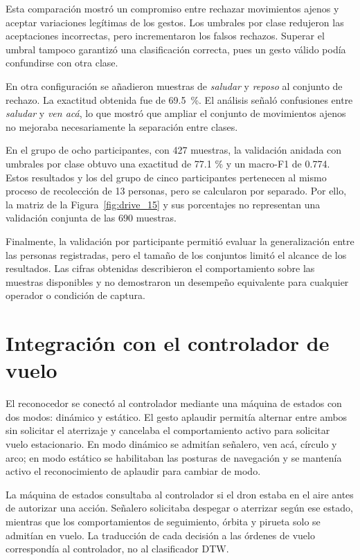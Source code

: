 Esta comparación mostró un compromiso entre rechazar movimientos ajenos y aceptar variaciones legítimas de los gestos. Los umbrales por clase redujeron las aceptaciones incorrectas, pero incrementaron los falsos rechazos. Superar el umbral tampoco garantizó una clasificación correcta, pues un gesto válido podía confundirse con otra clase.

En otra configuración se añadieron muestras de \textit{saludar} y \textit{reposo} al conjunto de rechazo. La exactitud obtenida fue de 69.5 \%. El análisis señaló confusiones entre \textit{saludar} y \textit{ven acá}, lo que mostró que ampliar el conjunto de movimientos ajenos no mejoraba necesariamente la separación entre clases.

En el grupo de ocho participantes, con 427 muestras, la validación anidada con umbrales por clase obtuvo una exactitud de 77.1 \% y un macro-F1 de 0.774. Estos resultados y los del grupo de cinco participantes pertenecen al mismo proceso de recolección de 13 personas, pero se calcularon por separado. Por ello, la matriz de la Figura~\ref{fig:drive_15} y sus porcentajes no representan una validación conjunta de las 690 muestras.

Finalmente, la validación por participante permitió evaluar la generalización entre las personas registradas, pero el tamaño de los conjuntos limitó el alcance de los resultados. Las cifras obtenidas describieron el comportamiento sobre las muestras disponibles y no demostraron un desempeño equivalente para cualquier operador o condición de captura.

\section{Integración con el controlador de vuelo}

El reconocedor se conectó al controlador mediante una máquina de estados con dos modos: dinámico y estático. El gesto aplaudir permitía alternar entre ambos sin solicitar el aterrizaje y cancelaba el comportamiento activo para solicitar vuelo estacionario. En modo dinámico se admitían señalero, ven acá, círculo y arco; en modo estático se habilitaban las posturas de navegación y se mantenía activo el reconocimiento de aplaudir para cambiar de modo.

La máquina de estados consultaba al controlador si el dron estaba en el aire antes de autorizar una acción. Señalero solicitaba despegar o aterrizar según ese estado, mientras que los comportamientos de seguimiento, órbita y pirueta solo se admitían en vuelo. La traducción de cada decisión a las órdenes de vuelo correspondía al controlador, no al clasificador DTW.

